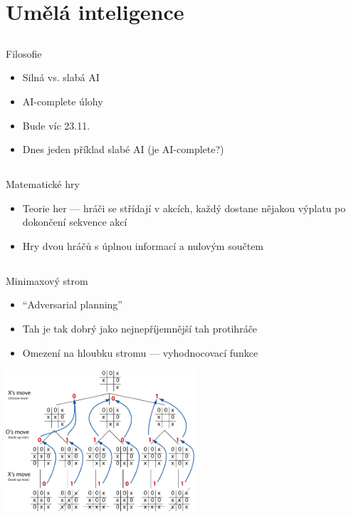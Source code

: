 \documentclass{beamer}
\begin{document}
\section{Umělá inteligence}

\subsection{}
\begin{frame}{Filosofie}
\begin{itemize}
\item Silná vs. slabá AI
\item AI-complete úlohy
\item Bude víc 23.11.
\item Dnes jeden příklad slabé AI (je AI-complete?)
\end{itemize}
\end{frame}

\subsection{}
\begin{frame}{Matematické hry}
\begin{itemize}
\item Teorie her --- hráči se střídají v akcích, každý dostane nějakou výplatu po dokončení sekvence akcí
\item Hry dvou hráčů s úplnou informací a nulovým součtem
\end{itemize}
\end{frame}

\subsection{}
\begin{frame}{Minimaxový strom}
\begin{itemize}
\item ``Adversarial planning''
\item Tah je tak dobrý jako nejnepříjemnější tah protihráče
\item Omezení na hloubku stromu --- vyhodnocovací funkce
\end{itemize}
\begin{center}
\includegraphics[width=7cm]{minimax-illustration.jpg}
\end{center}
\end{frame}
\end{document}
